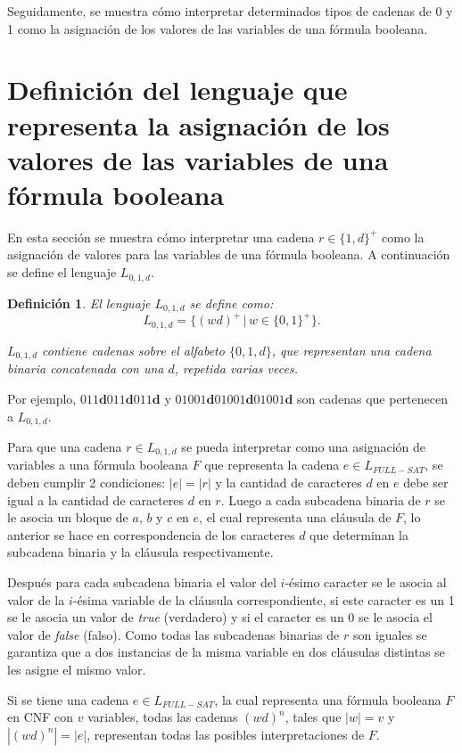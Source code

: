 \documentclass[12pt]{article}
\newtheorem{definition}{Definición}
\newcommand{\true}{\textit{true}}
\newcommand{\false}{\textit{false}}
\begin{document}
Seguidamente, se muestra cómo interpretar determinados tipos de cadenas de 0 y 1 como la asignación de los valores de las variables de una fórmula booleana.

\section{Definición del lenguaje que representa la asignación de los valores de las variables de una fórmula booleana}
\label{sec:intsat}

En esta sección se muestra cómo interpretar una cadena $r\in \{1,d\}^+$ como la asignación de valores para las variables de una fórmula booleana.
A continuación se define el lenguaje $L_{0,1,d}$.


\begin{definition}
    El lenguaje $L_{0,1,d}$ se define como:
    $$L_{0,1,d}=\{(wd)^+\,|\,w\in\{0,1\}^+\}.$$
    
    $L_{0,1,d}$ contiene cadenas sobre el alfabeto $\{0,1,d\}$, que representan una cadena binaria concatenada con una $d$,
    repetida varias veces.
\end{definition}

Por ejemplo, $011\mathbf{d}011\mathbf{d}011\mathbf{d}$ y $01001\mathbf{d}01001\mathbf{d}01001\mathbf{d}$ son cadenas que pertenecen a
$L_{0,1,d}$.

Para que una cadena $r\in L_{0,1,d}$ se pueda interpretar como una asignación de variables a una fórmula booleana $F$
que representa la cadena $e\in L_{FULL-SAT}$, se deben cumplir 2 condiciones: $|e|=|r|$ y la cantidad de caracteres $d$ en
$e$ debe ser igual a la cantidad de caracteres $d$ en $r$. Luego 
a cada subcadena binaria de $r$ se le asocia un bloque de 
$a$, $b$ y $c$ en $e$, el cual representa una cláusula de $F$, lo anterior se hace en correspondencia de los caracteres $d$
que determinan la subcadena binaria y la cláusula respectivamente. 

Después para cada subcadena binaria el valor del $i$-ésimo caracter se le asocia al valor de 
la $i$-ésima variable de la cláusula correspondiente, si este caracter es un 1 se le asocia un valor de \true{} (verdadero) y 
si el caracter es un 0 se le asocia el valor de \false{} (falso). Como todas las subcadenas binarias de $r$ son iguales 
se garantiza que a dos instancias de la misma variable en dos cláusulas distintas se les asigne el mismo valor. 

Si se tiene una cadena $e\in L_{FULL-SAT}$, la cual representa una fórmula booleana $F$ en CNF con $v$ variables, todas las cadenas $(wd)^n$, tales que $|w|=v$ y $|(wd)^n|=|e|$, representan todas las posibles interpretaciones de $F$.
\end{document}

